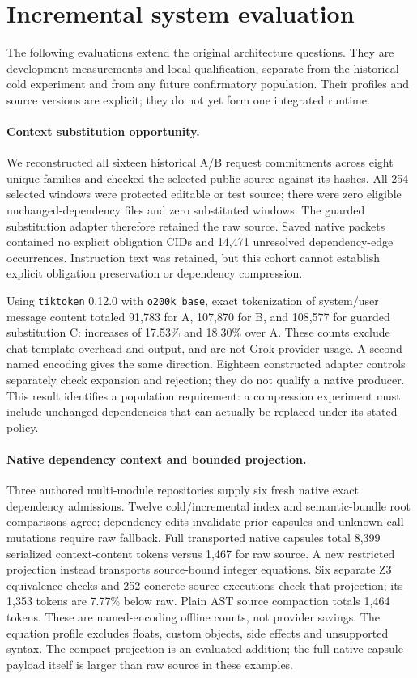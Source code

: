 \section{Incremental system evaluation}
\label{sec:incremental-evaluation}

The following evaluations extend the original architecture questions. They are
development measurements and local qualification, separate from the historical
cold experiment and from any future confirmatory population. Their profiles
and source versions are explicit; they do not yet form one integrated runtime.

\paragraph{Context substitution opportunity.}
We reconstructed all sixteen historical A/B request commitments across eight
unique families and checked the selected public source against its hashes.
All 254 selected windows were protected editable or test source; there were
zero eligible unchanged-dependency files and zero substituted windows.
The guarded substitution adapter therefore retained the raw source. Saved
native packets contained no explicit obligation CIDs and 14,471 unresolved
dependency-edge occurrences. Instruction text was retained, but this cohort
cannot establish explicit obligation preservation or dependency compression.

Using \texttt{tiktoken} 0.12.0 with \texttt{o200k\_base}, exact tokenization of
system/user message content totaled 91,783 for A, 107,870 for B, and 108,577 for
guarded substitution C: increases of 17.53\% and 18.30\% over A.
These counts exclude chat-template overhead and output, and are not Grok
provider usage. A second named encoding gives the same direction.
Eighteen constructed adapter controls separately check expansion and rejection;
they do not qualify a native producer. This result identifies a population
requirement: a compression experiment must include unchanged dependencies that
can actually be replaced under its stated policy.

\paragraph{Native dependency context and bounded projection.}
Three authored multi-module repositories supply six fresh native exact
dependency admissions. Twelve cold/incremental index and semantic-bundle root
comparisons agree; dependency edits invalidate prior capsules and unknown-call
mutations require raw fallback. Full transported native capsules total
8,399 serialized context-content
tokens versus 1,467 for raw source. A new restricted projection instead
transports source-bound integer equations. Six separate Z3 equivalence checks
and 252 concrete source executions check that projection; its 1,353
tokens are 7.77\% below raw. Plain AST source compaction totals
1,464 tokens. These are named-encoding offline counts, not provider savings.
The equation profile excludes floats, custom objects, side effects and unsupported
syntax. The compact projection is an evaluated addition; the full native capsule
payload itself is larger than raw source in these examples.

